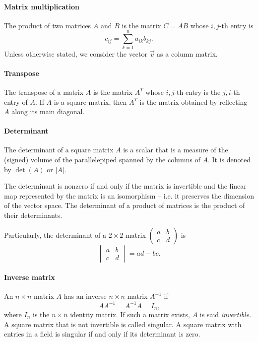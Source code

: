 \paragraph{Matrix multiplication}  The product of two matrices $A$ and $B$ is the matrix
$C = A B$ whose $i, j$-th entry is $$c_{ij} = \sum_{k = 1}^n a_{ik} b_{kj}\text{.}$$
Unless otherwise stated, we consider the vector $\vec{v}$ as a column matrix.

\paragraph{Transpose}  The transpose of a matrix $A$ is the matrix $A^T$ whose $i, j$-th
entry is the $j, i$-th entry of $A$.  If $A$ is a square matrix, then $A^T$ is the
matrix obtained by reflecting $A$ along its main diagonal.

\paragraph{Determinant}  The determinant of a square matrix $A$ is a scalar that is a
measure of the (signed) volume of the parallelepiped spanned by the columns of $A$.  It is
denoted by $\det(A)$ or $|A|$.

The determinant is nonzero if and only if the matrix is invertible and the linear map
represented by the matrix is an isomorphism -- i.e. it preserves the dimension of the
vector space.  The determinant of a product of matrices is the product of their
determinants.

Particularly, the determinant of a $2 \times 2$ matrix $\begin{pmatrix} a & b \\ c & d
\end{pmatrix}$ is $$\begin{vmatrix} a & b \\ c & d \end{vmatrix} = ad - bc\text{.}$$

\paragraph{Inverse matrix}  An $n \times n$ matrix $A$ has an inverse $n \times n$ matrix
$A^{-1}$ if
\[
  A A^{-1} = A^{-1} A = I_n\text{,}
\]
where $I_n$ is the $n \times n$ identity matrix.  If such a matrix exists, $A$ is said
\emph{invertible}.  A square matrix that is not invertible is called singular. A square
matrix with entries in a field is singular if and only if its determinant is zero.

